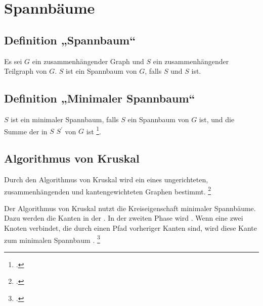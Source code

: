 \documentclass{lehramt-informatik-haupt}
\begin{document}

\chapter{Spannbäume}

%

\section{Definition „Spannbaum“}

Es sei $G$ ein zusammenhängender Graph und $S$ ein zusammenhängender
Teilgraph von $G$. $S$ ist ein Spannbaum von $G$, falls $S$  und $S$  ist.

%

\section{Definition „Minimaler Spannbaum“}

$S$ ist ein minimaler Spannbaum, falls $S$ ein Spannbaum von $G$ ist,
und die Summe der  in $S$  $S^\prime$ von $G$ ist
\footcite[Seite 29]{aud:fs:6}.

%

\section{Algorithmus von Kruskal}

Durch den Algorithmus von Kruskal wird ein 
eines ungerichteten, zusammenhängenden und kantengewichteten Graphen
bestimmt.
\footcite[Seite 30 (PDF 24)]{aud:fs:6}

Der Algorithmus von Kruskal nutzt die Kreiseigenschaft minimaler
Spannbäume. Dazu werden die Kanten in der 
. In der zweiten Phase
wird . Wenn eine
 zwei Knoten verbindet, die  durch einen
Pfad vorheriger Kanten  sind, wird diese Kante zum
minimalen Spannbaum .
\footcite{wiki:kruskal}
\end{document}
